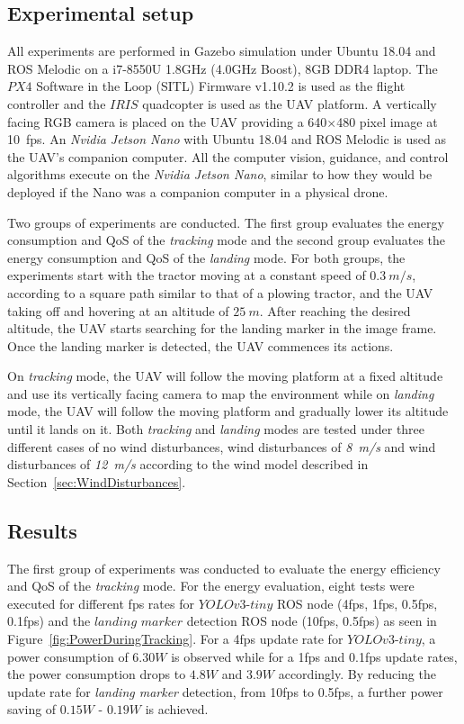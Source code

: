 \documentclass[conference]{IEEEtran}
\begin{document}

\subsection{Experimental setup}

All experiments are performed in Gazebo simulation under Ubuntu 18.04
and ROS Melodic on a i7-8550U 1.8GHz (4.0GHz Boost), 8GB DDR4
laptop. The $PX4$ Software in the Loop (SITL) Firmware v1.10.2 is used as the flight
controller and the $IRIS$ quadcopter is used as the UAV platform. A
vertically facing RGB camera is placed on the UAV providing a
640$\times$480 pixel image at 10~fps. An \emph{Nvidia Jetson Nano}
with Ubuntu 18.04 and ROS Melodic is used as the UAV's companion
computer. All the computer vision, guidance, and control algorithms 
execute on the \emph{Nvidia Jetson Nano}, similar to how they would
be deployed if the Nano was a companion computer in a physical drone.

Two groups of experiments are conducted. The first group evaluates the
energy consumption and QoS of the \emph{tracking} mode and the second group
evaluates the energy consumption and QoS of the \emph{landing} mode. For
both groups, the experiments start with the tractor moving at a
constant speed of $0.3~m/s$, according to a square path similar to that of a
plowing tractor, and the UAV taking off and hovering at an altitude of
$25~m$. After reaching the desired altitude, the UAV starts searching
for the landing marker in the image frame. Once the landing marker is
detected, the UAV commences its actions.

On \emph{tracking} mode, the UAV will follow the moving platform at a fixed
altitude and use its vertically facing camera to map the environment
while on \emph{landing} mode, the UAV will follow the moving platform and
gradually lower its altitude until it lands on it. Both \emph{tracking} and
\emph{landing} modes are tested under three different cases of no wind
disturbances, wind disturbances of \emph{8~m/s} and wind disturbances of
\emph{12~m/s} according to the wind model described in Section~\ref{sec:WindDisturbances}.


\subsection{Results}

The first group of experiments was conducted to evaluate the 
energy efficiency and QoS of the \emph{tracking} mode. For the energy 
evaluation, eight tests were executed for different fps rates 
for $YOLOv3$-$tiny$ ROS node (4fps, 1fps, 0.5fps, 0.1fps) and 
the $landing$ $marker$ detection ROS node (10fps, 0.5fps) as 
%
seen in Figure~\ref{fig:PowerDuringTracking}. For a 4fps update rate
for $YOLOv3$-$tiny$, a power consumption of $6.30 W$ is observed while
for a 1fps and 0.1fps update rates, the power consumption drops to
$4.8W$ and $3.9W$ accordingly. By reducing the update rate for
\emph{landing marker} detection, from 10fps to 0.5fps, a further power
saving of $0.15W$ - $0.19W$ is achieved.
\end{document}
